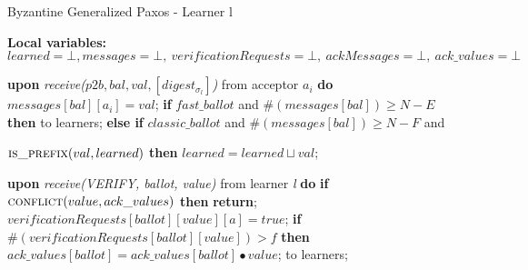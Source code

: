 \begin{algorithm}
	\caption{Byzantine Generalized Paxos - Learner l}
	\textbf{Local variables: } $learned = \bot, messages = \bot,\ verificationRequests = \bot,\ ackMessages = \bot,\ ack\_values = \bot$ 
	\begin{algorithmic}[1]
		\State \textbf{upon} \textit{receive($p2b, bal, val, [digest_{\sigma_l}]$)} from acceptor $a_i$ \textbf{do}
		\State \hspace{\algorithmicindent} $messages[bal][a_i] = val$;
		\State \hspace{\algorithmicindent} \textbf{if} $fast\_ballot$ and $\#(messages[bal]) \geq N-E$ \textbf{then}
		\State\hspace{\algorithmicindent}\hspace{\algorithmicindent}  to learners;
		\State \hspace{\algorithmicindent} \textbf{else if} $classic\_ballot$ and $\#(messages[bal]) \geq N-F$ and
		\item[] \hspace{\algorithmicindent}\hspace{\algorithmicindent}$\Call{is\_prefix}{val, learned}$ \textbf{then}
		\State \hspace{\algorithmicindent} \hspace{\algorithmicindent} $learned = learned \sqcup val$;
		
		\State 
		\State \textbf{upon} \textit{receive(VERIFY, ballot, value)} from learner \textit{l} \textbf{do}
		\State \hspace{\algorithmicindent}\textbf{if} $\Call{conflict}{value, ack\_values}$ \textbf{then}
		\State\hspace{\algorithmicindent}\hspace{\algorithmicindent}\textbf{return};
		\State
		\State\hspace{\algorithmicindent}$verificationRequests[ballot][value][a] = true$;
		\State\hspace{\algorithmicindent}\textbf{if} $\#(verificationRequests[ballot][value]) > f$ \textbf{then}
		\State\hspace{\algorithmicindent} \hspace{\algorithmicindent}	$ack\_values[ballot] = ack\_values[ballot] \bullet value$;
		\State \hspace{\algorithmicindent} \hspace{\algorithmicindent}  to learners;
		

\end{algorithmic}
\end{algorithm}

